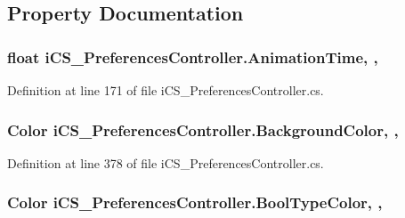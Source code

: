 \subsection{Property Documentation}
\hypertarget{classi_c_s___preferences_controller_a485a27768452170ca90d24bb5f3d6f9b}{
\subsubsection[{Animation\+Time}]{\setlength{\rightskip}{0pt plus 5cm}float i\+C\+S\+\_\+\+Preferences\+Controller.\+Animation\+Time\hspace{0.3cm}{\ttfamily [static]}, {\ttfamily [get]}, {\ttfamily [set]}}}\label{classi_c_s___preferences_controller_a485a27768452170ca90d24bb5f3d6f9b}


Definition at line 171 of file i\+C\+S\+\_\+\+Preferences\+Controller.\+cs.

\hypertarget{classi_c_s___preferences_controller_a0e0ed389fc2bbacb47fb46299771a4c6}{
\subsubsection[{Background\+Color}]{\setlength{\rightskip}{0pt plus 5cm}Color i\+C\+S\+\_\+\+Preferences\+Controller.\+Background\+Color\hspace{0.3cm}{\ttfamily [static]}, {\ttfamily [get]}, {\ttfamily [set]}}}\label{classi_c_s___preferences_controller_a0e0ed389fc2bbacb47fb46299771a4c6}


Definition at line 378 of file i\+C\+S\+\_\+\+Preferences\+Controller.\+cs.

\hypertarget{classi_c_s___preferences_controller_afccf5e467a9ec671eafa82ce33a7db6e}{
\subsubsection[{Bool\+Type\+Color}]{\setlength{\rightskip}{0pt plus 5cm}Color i\+C\+S\+\_\+\+Preferences\+Controller.\+Bool\+Type\+Color\hspace{0.3cm}{\ttfamily [static]}, {\ttfamily [get]}, {\ttfamily [set]}}}\label{classi_c_s___preferences_controller_afccf5e467a9ec671eafa82ce33a7db6e}



